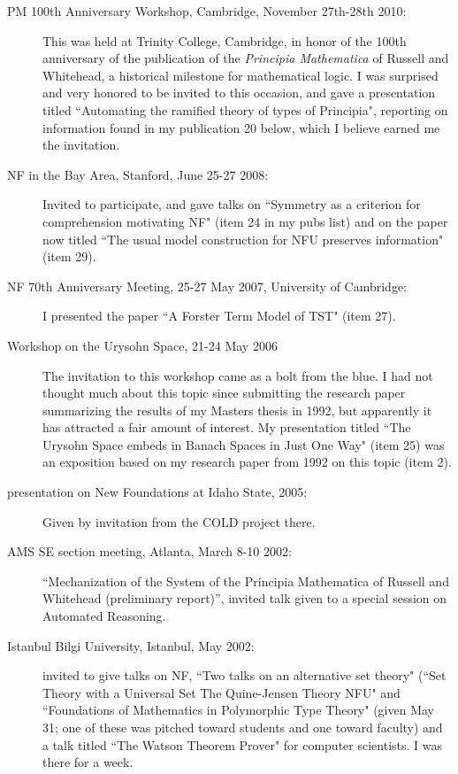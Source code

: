 \begin{description}
\begin{description}
\item[PM 100th Anniversary Workshop, Cambridge, November 27th-28th 2010:]   This was held at Trinity College, Cambridge, in honor of the 100th anniversary of the publication of the {\em Principia Mathematica\/} of Russell and Whitehead, a historical milestone for mathematical logic. I was surprised and very honored to be invited to this occasion, and gave a
presentation titled  ``Automating the ramified theory of types of Principia", reporting on information found in my publication 20 below, which I believe earned me the invitation.

\item[NF in the Bay Area, Stanford, June 25-27 2008:]  Invited to participate, and gave talks on  ``Symmetry as a criterion for comprehension motivating NF" (item 24 in my pubs list)  and on the paper now titled ``The usual model construction for NFU preserves information" (item 29).

\item[NF 70th Anniversary Meeting, 25-27 May 2007, University of Cambridge:]  I presented the paper ``A Forster Term Model of TST" (item 27).

\item[Workshop on the Urysohn Space, 21-24 May 2006]   The invitation to this workshop came as a bolt from the blue.  I had not thought much about this topic since submitting the research paper summarizing the results of my Masters thesis in 1992, but apparently it has attracted a fair amount of interest.  My presentation titled ``The Urysohn Space embeds in Banach Spaces in Just One Way"
(item 25) was an exposition based on my research paper from 1992 on this topic (item 2).

\item[presentation on New Foundations at Idaho State, 2005:]  Given by invitation from the COLD project there.

\item[AMS SE section meeting, Atlanta, March 8-10 2002:]  ``Mechanization of the System of the Principia Mathematica of Russell and Whitehead (preliminary report)'', invited talk given to a special session on Automated Reasoning.

\item[Istanbul Bilgi University, Istanbul, May 2002:]  invited to give talks on NF, ``Two talks on an alternative set theory"
(``Set Theory with a Universal Set
The Quine-Jensen Theory NFU" and ``Foundations of Mathematics in Polymorphic Type Theory"  (given May 31; one of these was pitched toward students and one toward faculty) and a talk titled ``The Watson Theorem Prover" for computer scientists.  I was there for a week.


\end{description}
\end{description}
